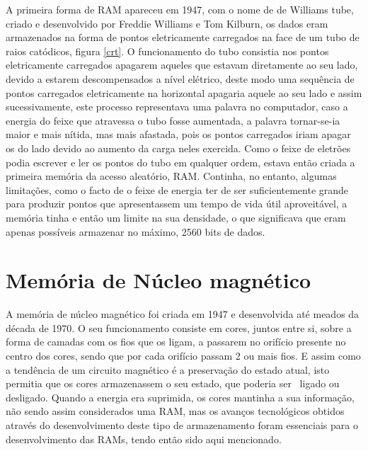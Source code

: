 \documentclass{report}
\begin{document}
\par A primeira forma de \ac{RAM} apareceu em 1947, com o nome de de Williams tube, criado e desenvolvido por Freddie Williams e Tom Kilburn, os dados eram armazenados na forma de pontos eletricamente carregados na face de um tubo de raios catódicos, figura \ref{crt}. O funcionamento do tubo consistia nos pontos eletricamente carregados apagarem aqueles que estavam diretamente ao seu lado, devido a estarem descompensados a nível elétrico, deste modo uma sequência de pontos carregados eletricamente na horizontal apagaria aquele ao seu lado e assim sucessivamente, este processo representava uma palavra no computador, caso a energia do feixe que atravessa o tubo fosse aumentada, a palavra tornar-se-ia maior e mais nítida, mas mais afastada, pois os pontos carregados iriam apagar os do lado devido ao aumento da carga neles exercida.  Como o feixe de eletrões podia escrever e ler os pontos do tubo em qualquer ordem, estava então criada a primeira memória da acesso aleatório, \ac{RAM}. Continha, no entanto, algumas limitações, como o facto de o feixe de energia ter de ser suficientemente grande para produzir pontos que apresentassem um tempo de vida útil aproveitável, a memória tinha e então um limite na sua densidade, o que significava que eram apenas possíveis armazenar no máximo, 2560 bits de dados.

\section{Memória de Núcleo magnético}


\par A memória de núcleo magnético foi criada em 1947 e desenvolvida até meados da década de 1970. O seu funcionamento consiste em cores, juntos entre si, sobre a forma de camadas com os fios que os ligam, a passarem no orifício presente no centro dos cores, sendo que por cada orifício passam 2 ou mais fios. E assim como a tendência de um circuito magnético é a preservação do estado atual, isto permitia que os cores armazenassem o seu estado, que poderia ser ~ligado ou desligado. Quando a energia era suprimida, os cores mantinha a sua informação, não sendo assim considerados uma \ac{RAM}, mas os avanços tecnológicos obtidos através do desenvolvimento deste tipo de armazenamento foram essenciais para o desenvolvimento das \ac{RAM}s, tendo então sido aqui mencionado.
\end{document}
